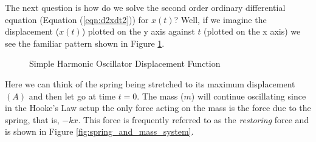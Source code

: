 \documentclass{article}
\theoremstyle{definition}
\begin{document}
\bigskip
\noindent
The next question is how do we solve the second order ordinary
differential equation (Equation (\ref{eqn:d2xdt2})) for $x(t)$?
Well, if we imagine the displacement ($x(t)$) plotted on the y
axis against $t$ (plotted on the x axis) we see the familiar
pattern shown in Figure \ref{fig:smh_displacement_function}.
%
%
\bigskip
\begin{figure}[H]
\centering
  \resizebox{0.435 \textwidth}{!} {																	%
}
\caption{Simple Harmonic Oscillator Displacement Function}
\label{fig:smh_displacement_function}
\end{figure}

\bigskip
\noindent
Here we can think of the spring being stretched to its maximum
displacement $(A)$ and then let go at time $t = 0$. The mass
($m$) will continue oscillating since in the Hooke's Law setup
the only force acting on the mass is the force due to the spring,
that is, $-kx$. This force is frequently referred to as the
\emph{restoring} force and is shown in Figure
\ref{fig:spring_and_mass_system}.
\end{document}
